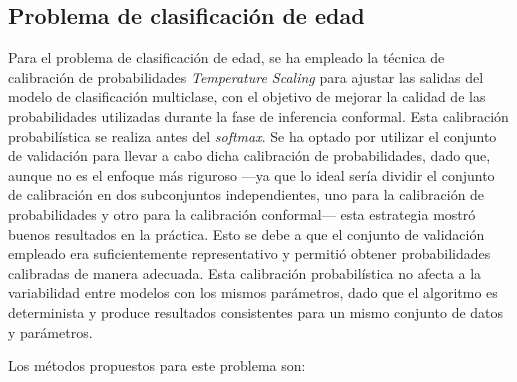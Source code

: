 \FloatBarrier


\subsection{Problema de clasificación de edad}




Para el problema de clasificación de edad, se ha empleado la técnica de calibración de probabilidades \textit{Temperature Scaling} para ajustar las salidas del modelo de clasificación multiclase, con el objetivo de mejorar la calidad de las probabilidades utilizadas durante la fase de inferencia conformal. Esta calibración probabilística se realiza antes del \textit{softmax}. Se ha optado por utilizar el conjunto de validación para llevar a cabo dicha calibración de probabilidades, dado que, aunque no es el enfoque más riguroso ---ya que lo ideal sería dividir el conjunto de calibración en dos subconjuntos independientes, uno para la calibración de probabilidades y otro para la calibración conformal--- esta estrategia mostró buenos resultados en la práctica. Esto se debe a que el conjunto de validación empleado era suficientemente representativo y permitió obtener probabilidades calibradas de manera adecuada. Esta calibración probabilística no afecta a la variabilidad entre modelos con los mismos parámetros, dado que el algoritmo es determinista y produce resultados consistentes para un mismo conjunto de datos y parámetros. 

Los métodos propuestos para este problema son:

